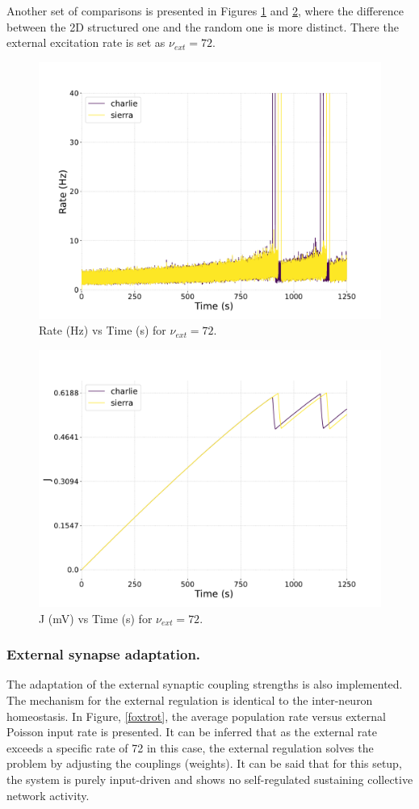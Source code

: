 \documentclass[a4paper,12pt]{article}
\begin{document}
Another set of comparisons is presented in Figures \ref{charlie72ratevstime} and \ref{charlie72alphavstime}, where the difference between the 2D structured one and the random one is more distinct. There the external excitation rate is set as $\nu_{ext} =  72.$
\begin{figure}[H] 
    \centering
    \includegraphics[width=0.8\linewidth]{nu_ext_72rate_over_time_homeostasis.pdf}
    \caption{Rate (Hz) vs Time (s) for $\nu_{ext} = 72$.}
    \label{charlie72ratevstime}
\end{figure}
\begin{figure}[H] 
    \centering
    \includegraphics[width=0.8\linewidth]{nu_ext_72alpha_over_time_homeostasis.pdf}
    \caption{J (mV) vs Time (s) for $\nu_{ext} = 72$.}
    \label{charlie72alphavstime}
\end{figure}

\subsubsection{External synapse adaptation.}
The adaptation of the external synaptic coupling strengths is also implemented. The mechanism for the external regulation is identical to the inter-neuron homeostasis. In Figure, \ref{foxtrot}, the average population rate versus external Poisson input rate is presented. It can be inferred that as the external rate exceeds a specific rate of 72 in this case, the external regulation solves the problem by adjusting the couplings (weights). It can be said that for this setup, the system is purely input-driven and shows no self-regulated sustaining collective network activity.
\end{document}
